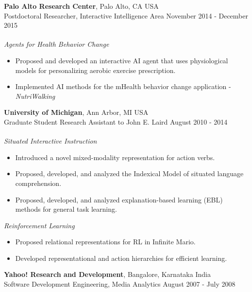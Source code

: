 \documentclass[margin,line,11pt]{res}
\begin{document}
\begin{resume}
                  {\bf Palo Alto Research Center}, Palo Alto, CA USA \\ {Postdoctoral Researcher}, Interactive Intelligence Area \hfill November 2014 - December 2015 \\ \\
                 \emph{Agents for Health Behavior Change}
                  \begin{itemize}
                    \item Proposed and developed an interactive AI agent that uses physiological models for personalizing aerobic exercise prescription. 
                    \item Implemented AI methods for the mHealth behavior change application - \emph{NutriWalking}
                      \end{itemize}
                  \newpage
                  {\bf University of Michigan}, Ann Arbor, MI USA \\ {Graduate Student Research Assistant} to John E. Laird \hfill August 2010 - 2014 \\ \\
                  \emph{Situated Interactive Instruction}
                  \begin{itemize}
                  \item Introduced a novel mixed-modality representation for action verbs. 
                    \item Proposed, developed, and analyzed the Indexical Model of situated language comprehension. 
                    \item Proposed, developed, and analyzed explanation-based learning (EBL) methods for general task learning. 
                  \end{itemize}

                  \emph{Reinforcement Learning}
                  \begin{itemize}
                  \item Proposed relational representations for RL in Infinite Mario.
                  \item Developed representational and action hierarchies for efficient learning. 
                  \end{itemize}

                  {\bf Yahoo! Research and Development}, Bangalore, Karnataka India \\ {Software Development Engineering}, Media Analytics \hfill August 2007 - July 2008




\end{resume}
\end{document}
